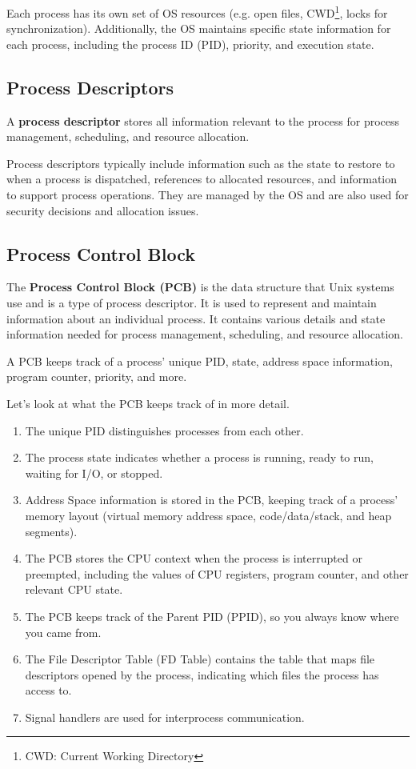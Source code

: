 \documentclass{report}
\newcommand{\definitionBegin}[1]{\begin{tcolorbox}[title={Definition: #1}]}
\newcommand{\definitionEnd}{\end{tcolorbox}}
\newcommand{\exampleBegin}[1]{\begin{tcolorbox}[colback=blue!5!white,colframe=black!75!blue,title={Example:
      #1}]}
\newcommand{\exampleEnd}{\end{tcolorbox}}
\begin{document}
Each process has its own set of OS resources (e.g. open files, CWD\footnote{CWD: Current Working
  Directory}, locks for synchronization). Additionally, the OS maintains specific state information
for each process, including the process ID (PID), priority, and execution state. 


\subsection{Process Descriptors}
\definitionBegin{Process Descriptor}
A \textbf{process descriptor} stores all information relevant to the process for process management,
scheduling, and resource allocation.
\definitionEnd

Process descriptors typically include information such as the state to restore to when a process is
dispatched, references to allocated resources, and information to support process operations. They
are managed by the OS and are also used for security decisions and allocation issues.


\subsection*{Process Control Block}
\definitionBegin{Process Control Block}
The \textbf{Process Control Block (PCB)} is the data structure that Unix systems use and is a type of process
descriptor. It is used to represent and maintain information about an individual process. It
contains various details and state information needed for process management, scheduling, and
resource allocation.
\definitionEnd

A PCB keeps track of a process' unique PID, state, address space information, program counter,
priority, and more.

\exampleBegin{What am I Holding?}
Let's look at what the PCB keeps track of in more detail.

\begin{enumerate}[label=\textit{(\roman*)}]
\item The unique PID distinguishes processes from each other. 
\item The process state indicates whether a process is running, ready to run, waiting for I/O, or
  stopped. 
\item Address Space information is stored in the PCB, keeping track of a process' memory layout
  (virtual memory address space, code/data/stack, and heap segments). 
\item The PCB stores the CPU context when the process is interrupted or preempted, including the
  values of CPU registers, program counter, and other relevant CPU state. 
\item The PCB keeps track of the Parent PID (PPID), so you always know where you came from. 
\item The File Descriptor Table (FD Table) contains the table that maps file descriptors opened by
  the process, indicating which files the process has access to. 
\item Signal handlers are used for interprocess communication. 
\end{enumerate}
\exampleEnd
\end{document}
